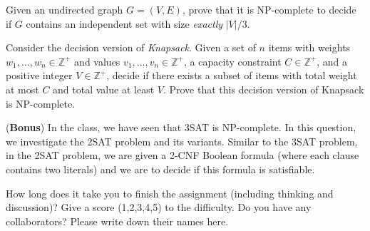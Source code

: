 \documentclass{oxmathproblems}
\begin{document}
\begin{questions}
\begin{Solution}
\end{Solution}

\miquestion
Given an undirected graph $G=(V,E)$, prove that it is NP-complete to decide if $G$ contains an independent set with size \emph{exactly} $|V|/3$.

\miquestion
Consider the decision version of \emph{Knapsack}. Given a set of $n$ items with weights $w_1,\ldots,w_n\in\mathbb{Z}^+$ and values $v_1,\ldots,v_n\in\mathbb{Z}^+$, a capacity constraint $C\in\mathbb{Z}^+$, and a positive integer $V\in\mathbb{Z}^+$, decide if there exists a subset of items with total weight at most $C$ and total value at least $V$. Prove that this decision version of Knapsack is NP-complete.

\miquestion
(\textbf{Bonus})
In the class, we have seen that 3SAT is NP-complete.
In this question, we investigate the 2SAT problem and its variants.
Similar to the 3SAT problem, in the 2SAT problem, we are given a 2-CNF Boolean formula (where each clause contains two literals) and we are to decide if this formula is satisfiable.

\miquestion
How long does it take you to finish the assignment (including thinking and discussion)?
Give a score (1,2,3,4,5) to the difficulty.
Do you have any collaborators?
Please write down their names here.

\end{questions}
\end{document}

